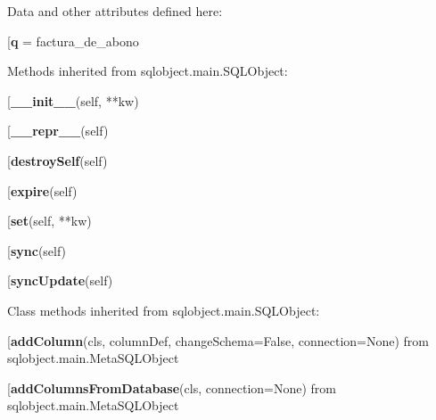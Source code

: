 Data and other attributes defined here:\\
\begin{description}\item[{\bf q} = factura\_de\_abono\end{description}


Methods inherited from sqlobject.main.SQLObject:\\
\begin{description}\item[{\bf \_\_init\_\_}(self, **kw)\end{description}

\begin{description}\item[{\bf \_\_repr\_\_}(self)\end{description}

\begin{description}\item[{\bf destroySelf}(self)\end{description}

\begin{description}\item[{\bf expire}(self)\end{description}

\begin{description}\item[{\bf set}(self, **kw)\end{description}

\begin{description}\item[{\bf sync}(self)\end{description}

\begin{description}\item[{\bf syncUpdate}(self)\end{description}


Class methods inherited from sqlobject.main.SQLObject:\\
\begin{description}\item[{\bf addColumn}(cls, columnDef, changeSchema=False, connection=None) from sqlobject.main.MetaSQLObject\end{description}

\begin{description}\item[{\bf addColumnsFromDatabase}(cls, connection=None) from sqlobject.main.MetaSQLObject\end{description}

